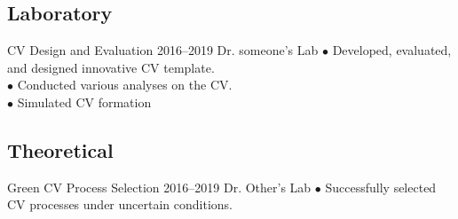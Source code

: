 \documentclass[
	a4paper,
]{ThirtyNinesecondscv}
\begin{document}


\newpage
\makebacksidebar


\subsection{Laboratory}
\begin{cvtable}[1.5]
    \customcvitem
            {\faUniversity}
            {CV Design and Evaluation} 
            {2016--2019}
            {Dr.  someone's Lab}
            {$\bullet$ Developed, evaluated, and designed innovative CV template.\\
     $\bullet$ Conducted various analyses on the CV. \\
     $\bullet$ Simulated CV formation }
\end{cvtable}

\subsection{Theoretical}
    \begin{cvtable}[1.5]
	\customcvitem
                {\faUniversity}
                {Green CV Process Selection}
                {2016--2019}
                {Dr. Other's Lab}
                {$\bullet$ Successfully selected CV processes under uncertain conditions. \\

}

	
\end{cvtable}

{}
\end{document}
